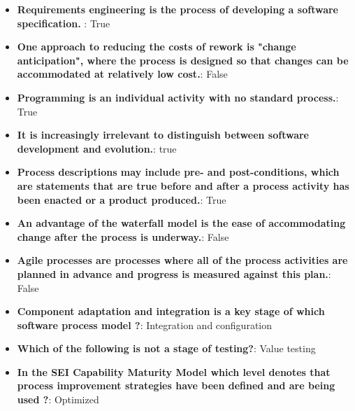 \documentclass{report}
\begin{document}
    \pagebreak 
    \begin{itemize}
        \item \textbf{Requirements engineering is the process of developing a software specification.} : True
        \item \textbf{One approach to reducing the costs of rework is "change anticipation", where the process is designed so that changes can be accommodated at relatively low cost.}: False
        \item \textbf{Programming is an individual activity with no standard process.}: True
        \item \textbf{It is increasingly irrelevant to distinguish between software development and evolution.}: true
        \item \textbf{Process descriptions may include pre- and post-conditions, which are statements that are true before and after a process activity has been enacted or a product produced.}: True
        \item \textbf{An advantage of the waterfall model is the ease of accommodating change after the process is underway.}: False
        \item \textbf{Agile processes are processes where all of the process activities are planned in advance and progress is measured against this plan.}: False
        \item \textbf{Component adaptation and integration is a key stage of which software process model ?}: Integration and configuration
        \item \textbf{Which of the following is not a stage of testing?}: Value testing
        \item \textbf{In the SEI Capability Maturity Model which level denotes that process improvement strategies have been defined and are being used ?}: Optimized
    \end{itemize}
\end{document}
